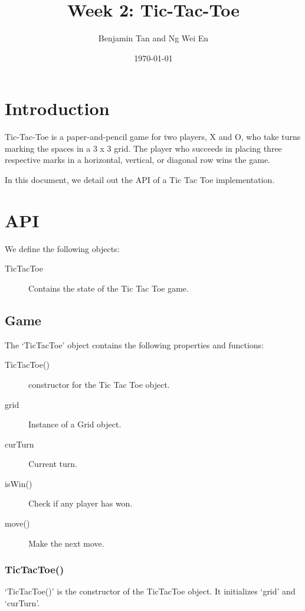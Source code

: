 \documentclass{article}
\title{Week 2: Tic-Tac-Toe}
\author{Benjamin Tan and Ng Wei En}
\date{\today}
\begin{document}
\maketitle

\section{Introduction}

Tic-Tac-Toe is a paper-and-pencil game for two players, X and O, who take turns marking the spaces in a 3 x 3 grid. The player who succeeds in placing three respective marks in a horizontal, vertical, or diagonal row wins the game.

In this document, we detail out the API of a Tic Tac Toe implementation.

\section{API}

We define the following objects:

\begin{description}
  \item[TicTacToe] Contains the state of the Tic Tac Toe game.
\end{description}

\subsection{Game}

The `TicTacToe' object contains the following properties and functions:

\begin{description}
  \item[TicTacToe()] constructor for the Tic Tac Toe object.

  \item[grid] Instance of a Grid object.
  \item[curTurn] Current turn.

  \item[isWin()] Check if any player has won.
  \item[move()] Make the next move.
\end{description}

\subsubsection{TicTacToe()}

`TicTacToe()' is the constructor of the TicTacToe object. It initializes `grid' and `curTurn'.
\end{document}
